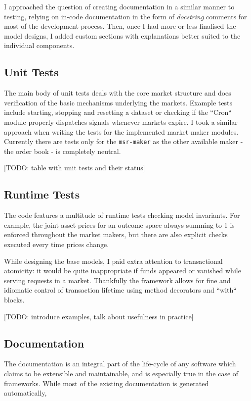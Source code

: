 \documentclass[bsc,frontabs,twoside,singlespacing,parskip,deptreport]{infthesis}     %
\begin{document}
I approached the question of creating documentation in a similar manner to testing, relying on in-code documentation in the form of {\em docstring} comments for most of the development process. Then, once I had more-or-less finalised the model designs, I added custom sections with explanations better suited to the individual components. 

\subsection{Unit Tests}

    The main body of unit tests deals with the core market structure and does verification of the basic mechanisms underlying the markets. Example tests include starting, stopping and resetting a dataset or checking if the ``Cron`` module properly dispatches signals whenever markets expire. 
    I took a similar approach when writing the tests for the implemented market maker modules. Currently there are tests only for the {\tt msr-maker} as the other available maker - the order book - is completely neutral. 

[TODO: table with unit tests and their status]
    
\subsection{Runtime Tests}
    
    The code features a multitude of runtime tests checking model invariants. For example, the joint asset prices for an outcome space always summing to 1 is enforced throughout the market makers, but there are also explicit checks executed every time prices change.

    While designing the base models, I paid extra attention to transactional atomicity: it would be quite inappropriate if funds appeared or vanished while serving requests in a market. Thankfully the framework allows for fine and idiomatic control of transaction lifetime using method decorators and ``with`` blocks.

[TODO: introduce examples, talk about usefulness in practice]

\subsection{Documentation}

    The documentation is an integral part of the life-cycle of any software which claims to be extensible and maintainable, and is especially true in the case of frameworks. While most of the existing documentation is generated automatically, 
    
\end{document}
